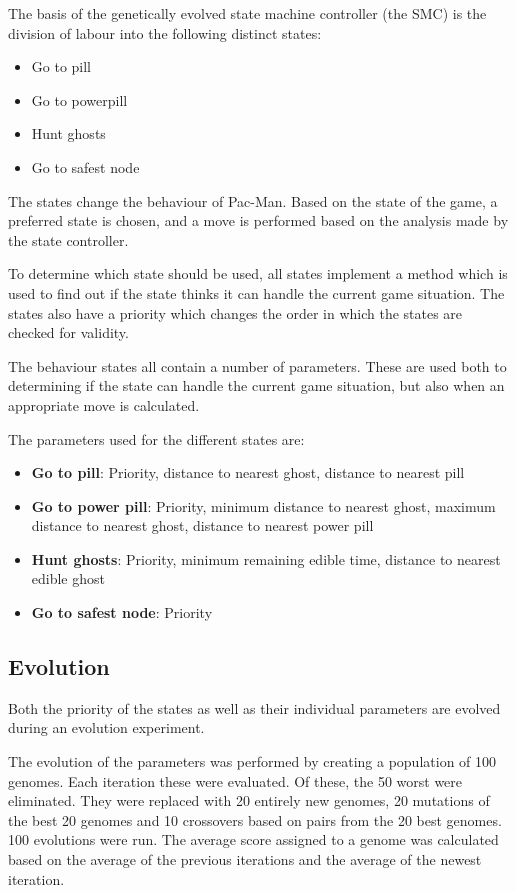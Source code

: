 The basis of the genetically evolved state machine controller (the SMC) is the division of labour into the following distinct states:

\begin{itemize}
\item Go to pill
\item Go to powerpill
\item Hunt ghosts
\item Go to safest node
\end{itemize}

The states change the behaviour of Pac-Man. Based on the state of the game, a preferred state is chosen, and a move is performed based on the analysis made by the state controller.

To determine which state should be used, all states implement a method which is used to find out if the state thinks it can handle the current game situation. The states also have a priority which changes the order in which the states are checked for validity.

The behaviour states all contain a number of parameters. These are used both to determining if the state can handle the current game situation, but also when an appropriate move is calculated.

The parameters used for the different states are:

\begin{itemize}
\item \textbf{Go to pill}: Priority, distance to nearest ghost, distance to nearest pill
\item \textbf{Go to power pill}: Priority, minimum distance to nearest ghost,  maximum distance to nearest ghost, distance to nearest power pill
\item \textbf{Hunt ghosts}: Priority, minimum remaining edible time, distance to nearest edible ghost
\item \textbf{Go to safest node}: Priority
\end{itemize}


\subsection*{Evolution}

Both the priority of the states as well as their individual parameters are evolved during an evolution experiment.

The evolution of the parameters was performed by creating a population of 100 genomes. Each iteration these were evaluated. Of these, the 50 worst were eliminated. They were replaced with 20 entirely new genomes, 20 mutations of the best 20 genomes and 10 crossovers based on pairs from the 20 best genomes. 100 evolutions were run. The average score assigned to a genome was calculated based on the average of the previous iterations and the average of the newest iteration.

